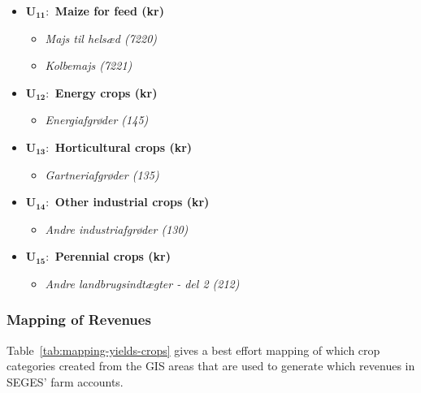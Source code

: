 \documentclass[12pt]{article}
\begin{document}
\begin{itemize}
\begin{itemize}
        \item[$+$] \textit{Helsæd (7218)}
        \item[$+$] \textit{Vedvarende græs (7219)}
    \end{itemize}
     \item[] \textbf{U$_{\textbf{11}}:$ Maize for feed (kr)}
    \begin{itemize}
        \item[$+$] \textit{Majs til helsæd (7220)} 
        \item[$+$] \textit{Kolbemajs (7221)}
    \end{itemize}
    \item[] \textbf{U$_{\textbf{12}}:$ Energy crops (kr)}
    \begin{itemize}
        \item[$+$] \textit{Energiafgrøder (145)}
    \end{itemize}
    \item[] \textbf{U$_{\textbf{13}}:$ Horticultural crops (kr)}
    \begin{itemize}
        \item[$+$] \textit{Gartneriafgrøder (135)}
    \end{itemize}
    \item[] \textbf{U$_{\textbf{14}}:$ Other industrial crops (kr)}
    \begin{itemize}
        \item[$+$] \textit{Andre industriafgrøder (130)}
    \end{itemize}
    \item[] \textbf{U$_{\textbf{15}}:$ Perennial crops (kr)}
    \begin{itemize}
        \item[$+$] \textit{Andre landbrugsindtægter - del 2 (212)}
    \end{itemize}
\end{itemize}

\subsubsection{Mapping of Revenues}
\label{sec:mapping-yields-crops}
Table~\ref{tab:mapping-yields-crops} gives a best effort mapping of which crop categories created from the GIS areas that are used to generate which revenues in SEGES' farm accounts.
\end{document}
